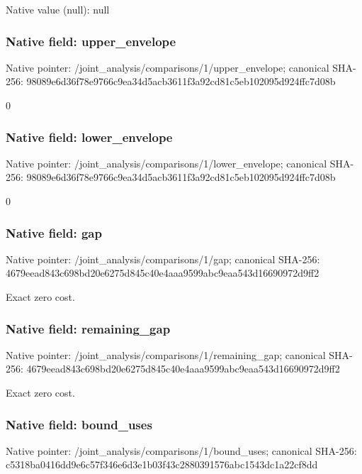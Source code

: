 \documentclass[10pt,a4paper]{article}
\begin{document}
Native value (null): null



\subsubsection{Native field: upper\_envelope}


Native pointer: /joint\_analysis/comparis\allowbreak{}ons/1/upper\_envelope; canonical SHA-256: 98089e6d36f78e9766c9ea34\allowbreak{}d5acb3611f3a92cd81c5eb10\allowbreak{}2095d924ffc7d08b


0


\subsubsection{Native field: lower\_envelope}


Native pointer: /joint\_analysis/comparis\allowbreak{}ons/1/lower\_envelope; canonical SHA-256: 98089e6d36f78e9766c9ea34\allowbreak{}d5acb3611f3a92cd81c5eb10\allowbreak{}2095d924ffc7d08b


0


\subsubsection{Native field: gap}


Native pointer: /joint\_analysis/comparisons/1/gap; canonical SHA-256: 4679eead843c698bd20e6275\allowbreak{}d845c40e4aaa9599abc9eaa5\allowbreak{}43d16690972d9ff2


Exact zero cost.


\subsubsection{Native field: remaining\_gap}


Native pointer: /joint\_analysis/comparis\allowbreak{}ons/1/remaining\_gap; canonical SHA-256: 4679eead843c698bd20e6275\allowbreak{}d845c40e4aaa9599abc9eaa5\allowbreak{}43d16690972d9ff2


Exact zero cost.


\subsubsection{Native field: bound\_uses}


Native pointer: /joint\_analysis/comparis\allowbreak{}ons/1/bound\_uses; canonical SHA-256: c5318ba0416dd9e6c57f346e\allowbreak{}6d3e1b03f43c2880391576ab\allowbreak{}c1543dc1a22cf8dd
\end{document}
